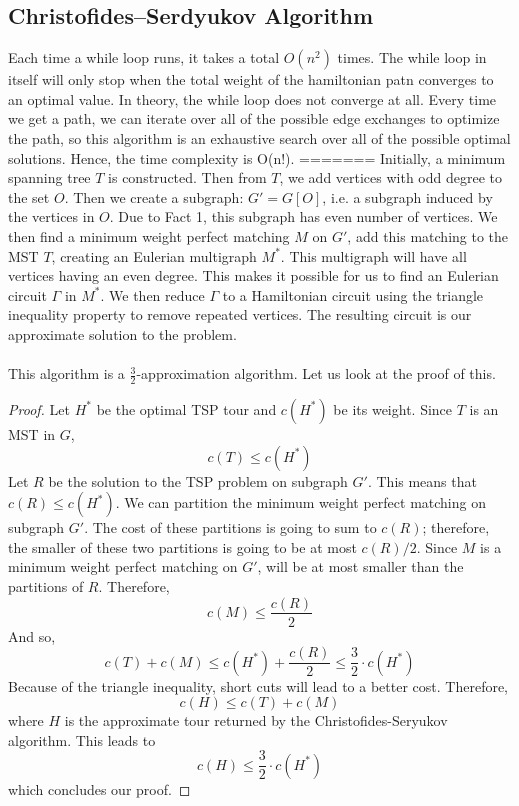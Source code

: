 \documentclass[11pt]{article}
\begin{document}
\subsection{Christofides–Serdyukov Algorithm}
Each time a while loop runs, it takes a total $O(n^2)$ times. The while loop in itself will only stop when the total weight of the hamiltonian patn converges to an optimal value. In theory, the while loop does not converge at all. Every time we get a path, we can iterate over all of the possible edge exchanges to optimize the path, so this algorithm is an exhaustive search over all of the possible optimal solutions. Hence, the time complexity is O(n!).
=======
  Initially, a minimum spanning tree $T$ is constructed. Then from $T$, we add vertices with odd degree to the set $O$. 
  Then we create a subgraph: $G' = G[O]$, i.e. a subgraph induced by the vertices in $O$. Due to Fact 1, this subgraph has 
  even number of vertices. We then find a minimum weight perfect matching $M$ on $G'$, add this matching to the MST $T$, creating 
  an Eulerian multigraph $M^*$. This multigraph will have all vertices having an even degree. This makes it possible for us 
  to find an Eulerian circuit $\Gamma$ in $M^*$. We then reduce $\Gamma$ to a Hamiltonian circuit using the triangle inequality 
  property to remove repeated vertices. The resulting circuit is our approximate solution to the problem. 
  \paragraph{}
  This algorithm is a $\frac{3}{2}$-approximation algorithm. Let us look at the proof of this. 
  \begin{proof}
    Let $H^*$ be the optimal TSP tour and $c(H^*)$ be its weight. 
    Since $T$ is an MST in $G$, \[c(T) \leq c(H^*)\] 
    Let $R$ be the solution to the TSP problem on subgraph $G'$. This means that $c(R) \leq c(H^*)$. We can partition the minimum weight perfect matching 
    on subgraph $G'$. The cost of these partitions is going to sum to $c(R)$; therefore, the smaller of these two partitions is 
    going to be at most $c(R)/2$. Since $M$ is a minimum weight perfect matching on $G'$, will be at most smaller than the partitions of $R$. 
    Therefore, \[c(M) \leq \frac{c(R)}{2}\]
    And so, \[c(T) + c(M) \leq c(H^*) + \frac{c(R)}{2} \leq \frac{3}{2} \cdot c(H^*)\]
    Because of the triangle inequality, short cuts will lead to a better cost. Therefore, 
    \[c(H) \leq c(T) + c(M) \] where $H$ is the approximate tour returned by the Christofides-Seryukov algorithm. This leads to
    \[c(H) \leq \frac{3}{2} \cdot c(H^*)\]
    which concludes our proof.
  \end{proof}
\end{document}
